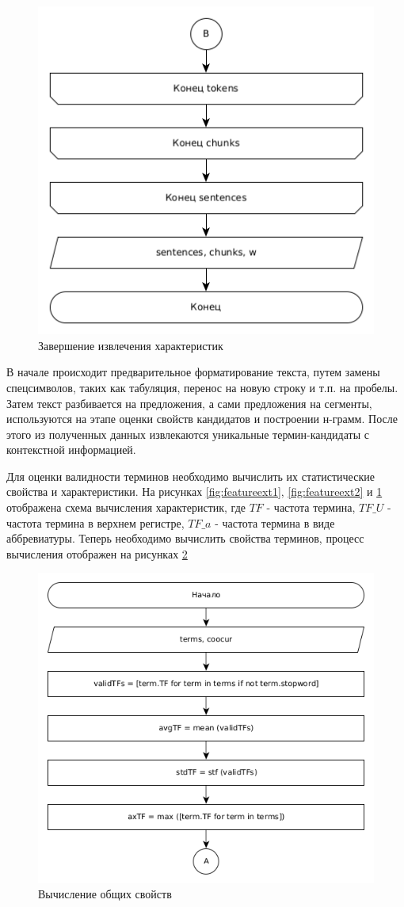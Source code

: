 \begin{figure}[!h]
	\centering
	\includegraphics[width=0.7\linewidth]{src/img/design/feature_ext_3}
	\caption{Завершение извлечения характеристик}
	\label{fig:featureext3}
\end{figure}
В начале происходит предварительное форматирование текста, путем замены спецсимволов, таких как табуляция, перенос на новую строку и т.п. на пробелы.
Затем текст разбивается на предложения, а сами предложения на сегменты, используются на этапе оценки свойств кандидатов и построении н-грамм. 
После этого из полученных данных извлекаются уникальные термин-кандидаты с контекстной информацией.

Для оценки валидности терминов необходимо вычислить их статистические свойства и характеристики.
На рисунках \ref{fig:featureext1}, \ref{fig:featureext2} и \ref{fig:featureext3} отображена схема вычисления характеристик, где $TF$ - частота термина, $TF\_U$ - частота термина в верхнем регистре, $TF\_a$ - частота термина в виде аббревиатуры.
Теперь необходимо вычислить свойства терминов, процесс вычисления отображен на рисунках \ref{fig:calculate1}
\begin{figure}[!h]
	\centering
	\includegraphics[width=0.7\linewidth]{src/img/design/calculate_1}
	\caption{Вычисление общих свойств}
	\label{fig:calculate1}
\end{figure}


